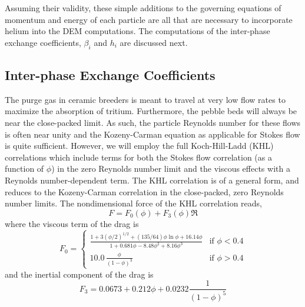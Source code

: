 Assuming their validity, these simple additions to the governing equations of momentum and energy of each particle are all that are necessary to incorporate helium into the DEM computations. The computations of the inter-phase exchange coefficients, $\beta_i$ and $h_i$ are discussed next.

\subsection{Inter-phase Exchange Coefficients}

The purge gas in ceramic breeders is meant to travel at very low flow rates to maximize the absorption of tritium. Furthermore, the pebble beds will always be near the close-packed limit. As such, the particle Reynolds number for these flows is often near unity and the Kozeny-Carman equation as applicable for Stokes flow is quite sufficient. However, we will employ the full Koch-Hill-Ladd (KHL) correlations which include terms for both the Stokes flow correlation (as a function of $\phi$) in the zero Reynolds number limit and the viscous effects with a Reynolds number-dependent term. The KHL correlation is of a general form, and reduces to the Kozeny-Carman correlation in the close-packed, zero Reynolds number limits.\cite{Koch2001} The nondimensional force of the KHL correlation reads,
\begin{equation}\label{eq:khl-correlation}
	F = F_0(\phi) + F_3(\phi)\Re
\end{equation}
where the viscous term of the drag is
\begin{equation}
F_0 = \begin{cases}
	\frac{1+3(\phi/2)^{1/2} + (135/64)\phi\ln\phi + 16.14\phi}{1 + 0.681\phi - 8.48 \phi^2 + 8.16\phi^3} & \text{if $\phi < 0.4$}\\
	10.0\,\frac{\phi}{(1-\phi)^3} & \text{if $\phi > 0.4$} 
	\end{cases}
\end{equation}
and the inertial component of the drag is
\begin{equation}
	F_3 = 0.0673 + 0.212\phi + 0.0232 \frac{1}{(1-\phi)^5}
\end{equation}

